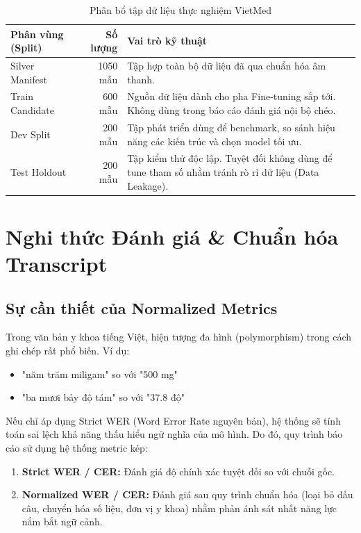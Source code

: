 \documentclass[12pt,a4paper]{article}
\begin{document}
\begin{table}[h]
\centering
\caption{Phân bổ tập dữ liệu thực nghiệm VietMed}
\begin{tabular}{|l|r|p{9cm}|}
\hline
\textbf{Phân vùng (Split)} & \textbf{Số lượng} & \textbf{Vai trò kỹ thuật} \\
\hline
Silver Manifest & 1050 mẫu & Tập hợp toàn bộ dữ liệu đã qua chuẩn hóa âm thanh. \\
\hline
Train Candidate & 600 mẫu & Nguồn dữ liệu dành cho pha Fine-tuning sắp tới. Không dùng trong báo cáo đánh giá nội bộ chéo. \\
\hline
Dev Split & 200 mẫu & Tập phát triển dùng để benchmark, so sánh hiệu năng các kiến trúc và chọn model tối ưu. \\
\hline
Test Holdout & 200 mẫu & Tập kiểm thử độc lập. Tuyệt đối không dùng để tune tham số nhằm tránh rò rỉ dữ liệu (Data Leakage). \\
\hline
\end{tabular}
\end{table}

\section{Nghi thức Đánh giá \& Chuẩn hóa Transcript}

\subsection{Sự cần thiết của Normalized Metrics}

Trong văn bản y khoa tiếng Việt, hiện tượng đa hình (polymorphism) trong cách ghi chép rất phổ biến.
Ví dụ:
\begin{itemize}
    \item "năm trăm miligam" so với "500 mg"
    \item "ba mươi bảy độ tám" so với "37.8 độ"
\end{itemize}
Nếu chỉ áp dụng Strict WER (Word Error Rate nguyên bản), hệ thống sẽ tính toán sai lệch khả năng thấu hiểu ngữ nghĩa của mô hình. Do đó, quy trình báo cáo sử dụng hệ thống metric kép:
\begin{enumerate}
    \item \textbf{Strict WER / CER:} Đánh giá độ chính xác tuyệt đối so với chuỗi gốc.
    \item \textbf{Normalized WER / CER:} Đánh giá sau quy trình chuẩn hóa (loại bỏ dấu câu, chuyển hóa số liệu, đơn vị y khoa) nhằm phản ánh sát nhất năng lực nắm bắt ngữ cảnh.
\end{enumerate}
\end{document}
